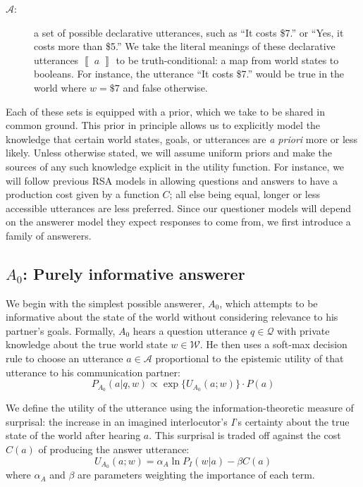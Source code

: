 \documentclass[11pt, floatsintext]{apa6}
\newcommand{\den}[2][]{
\(
\left\llbracket\;\text{#2}\;\right\rrbracket^{#1}
\)
}
\begin{document}
\begin{description}
\item[$\mathcal{A}$:] a set of possible declarative utterances, such as ``It costs \$7.'' or ``Yes, it costs more than \$5.'' We take the literal meanings of these declarative utterances \den{$a$} to be truth-conditional: a map from world states to booleans. For instance, the utterance ``It costs \$7.'' would be true in the world where $w = \$7$ and false otherwise. 
\end{description}

Each of these sets is equipped with a prior, which we take to be shared in common ground.
This prior in principle allows us to explicitly model the knowledge that certain world states, goals, or utterances are \emph{a priori} more or less likely. 
Unless otherwise stated, we will assume uniform priors and make the sources of any such knowledge explicit in the utility function. 
For instance, we will follow previous RSA models in allowing questions and answers to have a production cost given by a function $C$; all else being equal, longer or less accessible utterances are less preferred.
Since our questioner models will depend on the answerer model they expect responses to come from, we first introduce a family of answerers.

\subsection{$A_0$: Purely informative answerer}

We begin with the simplest possible answerer, $A_0$, which attempts to be informative about the state of the world without considering relevance to his partner's goals. 
Formally, $A_0$ hears a question utterance $q \in \mathcal{Q}$ with private knowledge about the true world state $w \in \mathcal{W}$. 
He then uses a soft-max decision rule to choose an utterance $a \in \mathcal{A}$ proportional to the epistemic utility of that utterance to his communication partner: 
$$P_{A_0}(a | q, w) \propto \exp\{U_{A_0}(a;w)\}\cdot P(a)$$ 

We define the utility of the utterance using the information-theoretic measure of surprisal: the increase in an imagined interlocutor's $I$'s certainty about the true state of the world after hearing $a$. This surprisal is traded off against the cost $C(a)$ of producing the answer utterance:
\begin{equation}
\label{eq:A0utility}
U_{A_0}(a;w) =  \alpha_A \ln P_I(w|a) - \beta C(a)
\end{equation}
where $\alpha_A$ and $\beta$ are parameters weighting the importance of each term.
\end{document}
